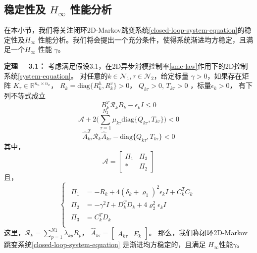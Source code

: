 \subsection{稳定性及 $H_{\infty}$ 性能分析 } \label{stability&H_infty}	
	在本小节，我们将关注闭环2D-Markov跳变系统\eqref{closed-loop-system-equation}的稳定性及$H_{\infty}$ 性能分析。我们将会提出一个充分条件，使得系统渐进均方稳定，且满足一个$H_{\infty}$ 性能 $\gamma$。
	
	{\bf 定理 \ \ 3.1：}
	考虑满足假设3.1，在2D异步滑模控制率\eqref{smc-law}作用下的2D控制系统\eqref{system-equation}。 对任意的$k\in\mathcal{N}_{1}, \tau\in\mathcal{N}_{2}$，给定标量 $\gamma>0$，如果存在矩阵 $K_{\tau }\in\mathbb{R}^{n_u\times n_x}$，  $R_{k}=\mathrm{diag}\{R^{h}_{k},R^{v}_{k}\}>0$，  $Q_{k\tau }>0$, $T_{k\tau }>0$ ，标量$\epsilon_{k}>0$， 有下列不等式成立
	\begin{equation}\label{T1C1}
	B^{T}_{k}  	\mathcal{R}_{k} B_{k} -\epsilon_{k}I \leq 0
	\end{equation}
	\begin{equation}\label{T1C2}
	\mathcal{A} +2\Big(\sum_{\tau =1}^{N_{2}}\mu_{k\tau } \mathrm{diag}\{Q_{k\tau }, T_{k\tau }\}\Big) < 0
	\end{equation}
	\begin{equation}\label{T1C3}
	\hat{A}^{T}_{k\tau }\mathcal{R}_{k}\hat{A}_{k\tau } - \mathrm{diag}\{Q_{k\tau }, T_{k\tau }\} < 0
	\end{equation}
	其中，
	\begin{equation*}
	\mathcal{A}=\begin{bmatrix}
	\varPi_{1} & \varPi_{3}\\
	*&\varPi_{2}
	\end{bmatrix}
	\end{equation*} 且，
	\begin{equation*} \label{varPi}
	\left\{
	\begin{array}{lr}
	\begin{split}
	\varPi_{1}&=-R_{k}+4(\delta_{k}+\varrho_{1})^{2}\epsilon_{k}I+C^{T}_{k}C_{k}\\
	\varPi_{2}&=-\gamma^{2}I+D^{T}_{k}D_{k}+4\varrho_{2}^{2}\epsilon_{k}I\\
	\varPi_{3}&= C_{k}^{T}D_{k}\\
	\end{split}
	\end{array}
	\right.
	\end{equation*}
	这里，$\mathcal{R}_{k}=\sum_{p=1}^{N1}\lambda_{kp}R_{p}$， $\hat{A}_{k\tau }=\begin{bmatrix}
	\bar{A}_{k\tau }& E_{k}
	\end{bmatrix}$。
	那么，我们称闭环2D-Markov跳变系统\eqref{closed-loop-system-equation} 是渐进均方稳定的，且满足 $H_{\infty}$性能$\gamma$。
	
